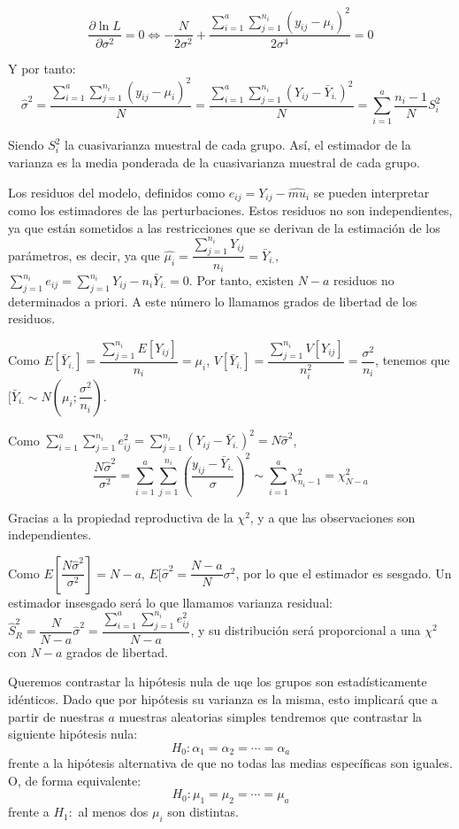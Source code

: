 \[\dfrac{\partial\ln{L}}{\partial\sigma^2}=0\Leftrightarrow-\dfrac{N}{2\sigma^2}+\dfrac{\sum_{i=1}^{a}\sum_{j=1}^{n_i}\left(y_{ij}-\mu_i\right)^2}{2\sigma^4}=0\]

Y por tanto:
\[\hat{\sigma}^2=\dfrac{\sum_{i=1}^{a}\sum_{j=1}^{n_i}\left(y_{ij}-\mu_i\right)^2}{N}=\dfrac{\sum_{i=1}^{a}\sum_{j=1}^{n_i}\left(Y_{ij}-\bar{Y}_{i.}\right)^2}{N}=\sum_{i=1}^{a}\dfrac{n_i-1}{N}S_i^2\]

Siendo $S_i^2$ la cuasivarianza muestral de cada grupo. As\'i, el estimador de la varianza es la media ponderada de la cuasivarianza muestral de cada grupo.

Los residuos del modelo, definidos como $e_{ij}=Y_{ij}-\hat{mu}_{i}$ se pueden interpretar como los estimadores de las perturbaciones. Estos residuos no son independientes, ya que est\'an sometidos a las restricciones que se derivan de la estimaci\'on de los par\'ametros, es decir, ya que $\hat{\mu_i}=\dfrac{\sum_{j=1}^{n_i}Y_{ij}}{n_i}=\bar{Y}_{i.}$, $\sum_{j=1}^{n_i}e_{ij}=\sum_{j=1}^{n_i}Y_{ij}-n_i\bar{Y}_{i.}=0$. Por tanto, existen $N-a$ residuos no determinados a priori. A este n\'umero lo llamamos grados de libertad de los residuos.

Como $E[\bar{Y}_{i.}]=\dfrac{\sum_{j=1}^{n_i}E[Y_{ij}]}{n_i}=\mu_i$, $V[\bar{Y}_{i.}]=\dfrac{\sum_{j=1}^{n_i}V[Y_{ij}]}{n_i^2}=\dfrac{\sigma^2}{n_i}$, tenemos que $[\bar{Y}_{i.}\sim N\left(\mu_i;\dfrac{\sigma^2}{n_i}\right)$.

Como $\sum_{i=1}^{a}\sum_{j=1}^{n_i}e_{ij}^2=\sum_{j=1}^{n_i}(Y_{ij}-\bar{Y}_{i.})^2=N\hat{\sigma}^2$,
\[\dfrac{N\hat{\sigma}^2}{\sigma^2}=\sum_{i=1}^{a}\sum_{j=1}^{n_i}\left(\dfrac{y_{ij}-\bar{Y}_{i.}}{\sigma}\right)^2\sim\sum_{i=1}^{a}\chi^2_{n_i-1}=\chi^2_{N-a}\]

Gracias a la propiedad reproductiva de la $\chi^2$, y a que las observaciones son independientes.

Como $E[\dfrac{N\hat{\sigma}^2}{\sigma^2}]=N-a$, $E[\hat{\sigma}^2=\dfrac{N-a}{N}\sigma^2$, por lo que el estimador es sesgado. Un estimador insesgado ser\'a lo que llamamos varianza residual: $\hat{S}_R^2=\dfrac{N}{N-a}\hat{\sigma}^2=\dfrac{\sum_{i=1}^{a}\sum_{j=1}^{n_i}e_{ij}^2}{N-a}$, y su distribuci\'on ser\'a proporcional a una $\chi^2$ con $N-a$ grados de libertad.

Queremos contrastar la hip\'otesis nula de uqe los grupos son estad\'isticamente id\'enticos. Dado que por hip\'otesis su varianza es la misma, esto implicar\'a que a partir de nuestras $a$ muestras aleatorias simples tendremos que contrastar la siguiente hip\'otesis nula:
\[H_0:\alpha_1=\alpha_2=\cdots=\alpha_a\]
frente a la hip\'otesis alternativa de que no todas las medias espec\'ificas son iguales.
O, de forma equivalente:
\[H_0:\mu_1=\mu_2=\cdots=\mu_a\]
frente a $H_1:$ al menos dos $\mu_i$ son distintas.

